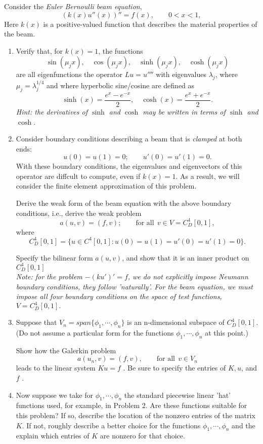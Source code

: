 Consider the \textit{Euler Bernoulli beam equation},
\[
(k(x)u''(x))'' = f(x), \qquad 0 < x < 1,
\]
Here $k(x)$ is a positive-valued function that describes the material properties of the beam.

\begin{enumerate}
\item Verify that, for $k(x) = 1$, the functions 
\[
\sin(\mu_j x),\quad \cos(\mu_jx), \quad \sinh(\mu_jx),\quad \cosh(\mu_jx)
\]
are all eigenfunctions the operator $Lu = u''''$ with eigenvalues $\lambda_j$, where $\mu_j = \lambda_j^{1/4}$ and where hyperbolic sine/cosine are defined as
\[
\sinh(x) = \frac{e^x-e^{-x}}{2}, \quad \cosh(x) = \frac{e^x+e^{-x}}{2}.
\]
\emph{Hint: the derivatives of $\sinh$ and $\cosh$ may be written in terms of $\sinh$ and $\cosh$.}

\item Consider boundary conditions describing a beam that is \textit{clamped} at both ends:
\[
u(0) = u(1) = 0; \qquad  u'(0) = u'(1) = 0.
\]
With these boundary conditions, the eigenvalues and eigenvectors of this operator are diffcult to compute, even if $k(x)=1$.  As a result, we will consider the finite element approximation of this problem.  

Derive the weak form of the beam equation with the above boundary conditions, i.e., derive the weak problem
\[
a(u,v) = (f, v); \qquad \mbox{for all} \:\:v \in V = C_D^4[0, 1],
\]
where
\[
C_D^4[0, 1] = \{u \in C^4[0, 1] : u(0) = u(1) = u'(0) = u'(1) = 0\}.
\]

Specify the bilinear form $a(u, v)$, and show that it is an inner product on $C_D^4[0, 1]$
\\
\emph{Note: for the problem $-(k u')' = f$, we do not explicitly impose Neumann boundary conditions, they follow 'naturally'. For the beam equation, we must impose all four boundary conditions on the space of test functions, $V =C_D^4[0, 1].$}

\item Suppose that $V_n = span\{\phi_1, \cdots, \phi_n\}$ is an n-dimensional subspace of $C_D^4[0, 1].$
(Do not assume a particular form for the functions $\phi_1, \cdots, \phi_n$ at this point.)

Show how the Galerkin problem
\[
a(u_n, v) = (f, v), \qquad \mbox{for all}\:\: v \in V_n
\]
leads to the linear system $Ku = f$ . Be sure to specify the entries of $K, u$, and $f$ .

\item Now suppose we take for $\phi_1, \cdots, \phi_n$  the standard piecewise linear 'hat' functions used, for example, in Problem 2. Are these functions suitable for this problem? If so, describe the location of the
nonzero entries of the matrix $K$. If not, roughly describe a better choice for the functions $\phi_1, \cdots, \phi_n$ 
and the explain which entries of $K$ are nonzero for that choice.
\end{enumerate}

